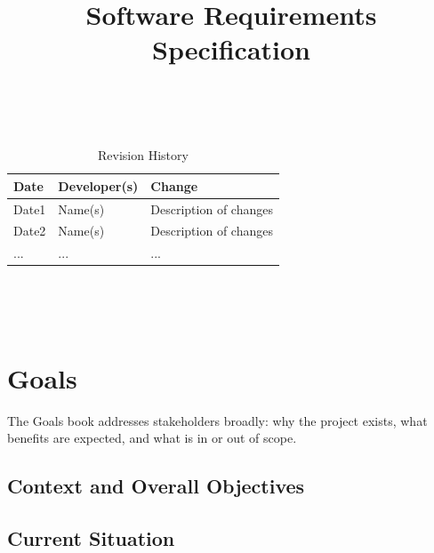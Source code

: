 \documentclass{article}
\title{Software Requirements Specification\\\progname}
\author{\authname}
\date{}
\begin{document}
\maketitle
\thispagestyle{empty}

~\newpage


\begin{table}[hp]
\caption{Revision History} \label{TblRevisionHistory}
\begin{tabularx}{\textwidth}{llX}
\toprule
\textbf{Date} & \textbf{Developer(s)} & \textbf{Change}\\
\midrule
Date1 & Name(s) & Description of changes\\
Date2 & Name(s) & Description of changes\\
... & ... & ...\\
\bottomrule
\end{tabularx}
\end{table}

~\newpage

\tableofcontents

~\newpage



\section{Goals} \label{sec:goals}

The Goals book addresses stakeholders broadly: why the project exists, what
benefits are expected, and what is in or out of scope.

\subsection{Context and Overall Objectives} \label{sec:g1}


\subsection{Current Situation} \label{sec:g2}

\end{document}
